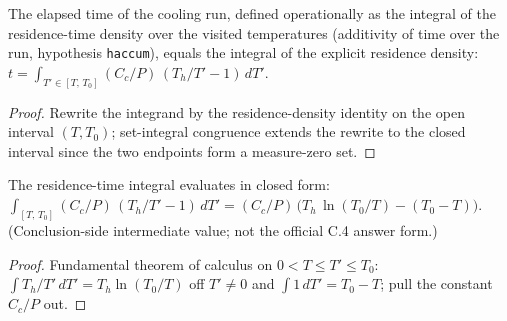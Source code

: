 \begin{theorem}
\label{thm:IPhO2026Problems_problem_IPhO_2026_3_C_4:elapsedTime_eq_integral}
The elapsed time of the cooling run, defined operationally as the
integral of the residence-time density over the visited temperatures
(additivity of time over the run, hypothesis \texttt{haccum}), equals
the integral of the explicit residence density:
$t = \int_{T' \in [T,\,T_0]} (C_c/P)\,(T_h/T' - 1)\,dT'$.
\end{theorem}
\begin{proof}
Rewrite the integrand by the residence-density identity on the open
interval $(T, T_0)$; set-integral congruence extends the rewrite to
the closed interval since the two endpoints form a measure-zero set.
\end{proof}

\begin{theorem}
\label{thm:IPhO2026Problems_problem_IPhO_2026_3_C_4:cooling_time_integral_eval}
The residence-time integral evaluates in closed form:
$\int_{[T,\,T_0]} (C_c/P)\,(T_h/T' - 1)\,dT'
= (C_c/P)\,\bigl(T_h\,\ln(T_0/T) - (T_0 - T)\bigr)$.
(Conclusion-side intermediate value; not the official C.4 answer
form.)
\end{theorem}
\begin{proof}
Fundamental theorem of calculus on $0 < T \le T' \le T_0$:
$\int T_h/T' \, dT' = T_h \ln(T_0/T)$ off $T' \neq 0$ and
$\int 1\,dT' = T_0 - T$; pull the constant $C_c/P$ out.
\end{proof}

